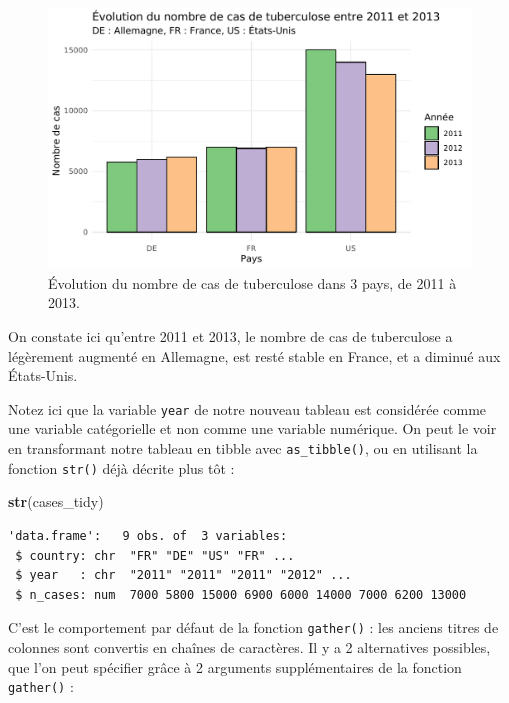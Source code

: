 \documentclass[a4paperpaper,]{article}
\newenvironment{Shaded}{\begin{snugshade}}{\end{snugshade}}
\newcommand{\KeywordTok}[1]{\textcolor[rgb]{0.13,0.29,0.53}{\textbf{#1}}}
\newcommand{\NormalTok}[1]{#1}
\theoremstyle{definition}
\theoremstyle{definition}
\theoremstyle{definition}
\theoremstyle{remark}
\begin{document}
\begin{figure}[htpb]

{\centering \includegraphics[width=0.9\linewidth]{figure/casesbarplot-1} 

}

\caption{Évolution du nombre de cas de tuberculose dans 3 pays, de 2011 à 2013.}\label{fig:casesbarplot}
\end{figure}

On constate ici qu'entre 2011 et 2013, le nombre de cas de tuberculose a
légèrement augmenté en Allemagne, est resté stable en France, et a
diminué aux États-Unis.

Notez ici que la variable \texttt{year} de notre nouveau tableau est
considérée comme une variable catégorielle et non comme une variable
numérique. On peut le voir en transformant notre tableau en tibble avec
\texttt{as\_tibble()}, ou en utilisant la fonction \texttt{str()} déjà
décrite plus tôt :

\begin{Shaded}
\begin{Highlighting}[]
\KeywordTok{str}\NormalTok{(cases_tidy)}
\end{Highlighting}
\end{Shaded}

\begin{verbatim}
'data.frame':   9 obs. of  3 variables:
 $ country: chr  "FR" "DE" "US" "FR" ...
 $ year   : chr  "2011" "2011" "2011" "2012" ...
 $ n_cases: num  7000 5800 15000 6900 6000 14000 7000 6200 13000
\end{verbatim}

C'est le comportement par défaut de la fonction \texttt{gather()} : les
anciens titres de colonnes sont convertis en chaînes de caractères. Il y
a 2 alternatives possibles, que l'on peut spécifier grâce à 2 arguments
supplémentaires de la fonction \texttt{gather()} :
\end{document}
